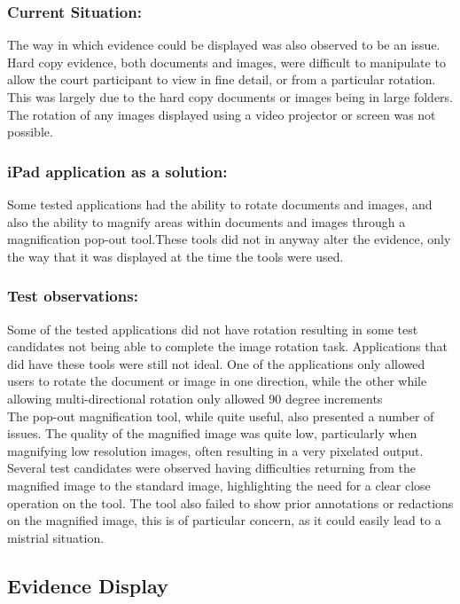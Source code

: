 \subsubsection{Current Situation:}
The way in which evidence could be displayed was also observed to be an issue. Hard copy evidence, both documents and images, were difficult to manipulate to allow the court participant to view in fine detail, or from a particular rotation. This was largely due to the hard copy documents or images being in large folders. The rotation of any images displayed using a video projector or screen was not possible.

\subsubsection{iPad application as a solution:}
Some tested applications had the ability to rotate documents and images, and also the ability to magnify areas within documents and images through a magnification pop-out tool.These tools did not in anyway alter the evidence, only the way that it was displayed at the time the tools were used.

\subsubsection{Test observations:}
Some of the tested applications did not have rotation resulting in some test candidates not being able to complete the image rotation task. Applications that did have these tools were still not ideal. One of the applications only allowed users to rotate the document or image in one direction, while the other while allowing multi-directional rotation only allowed 90 degree increments\\
The pop-out magnification tool, while quite useful, also presented a number of issues. The quality of the magnified image was quite low, particularly when magnifying low resolution images, often resulting in a very pixelated output. Several test candidates were observed having difficulties returning from the magnified image to the standard image, highlighting the need for a clear close operation on the tool. The tool also failed to show prior annotations or redactions on the magnified image, this is of particular concern, as it could easily lead to a mistrial situation.

\subsection{Evidence Display}
